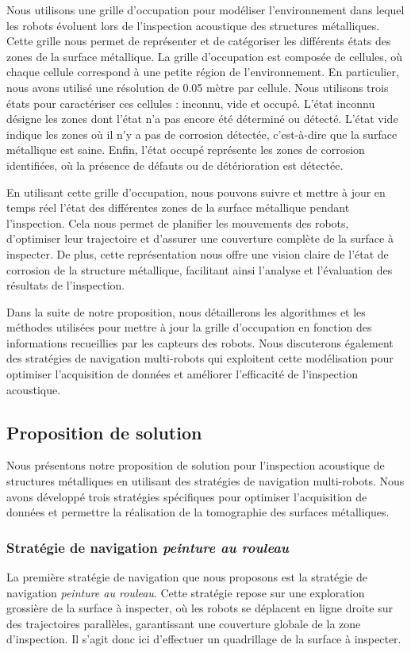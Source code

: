 \documentclass[francais,RandD]{rapportPFE}
\begin{document}
			Nous utilisons une grille d'occupation pour modéliser l'environnement dans lequel les robots évoluent lors de l'inspection acoustique des structures métalliques.
			Cette grille nous permet de représenter et de catégoriser les différents états des zones de la surface métallique.
			La grille d'occupation est composée de cellules, où chaque cellule correspond à une petite région de l'environnement.
			En particulier, nous avons utilisé une résolution de 0.05 mètre par cellule.
			Nous utilisons trois états pour caractériser ces cellules : inconnu, vide et occupé.
			L'état inconnu désigne les zones dont l'état n'a pas encore été déterminé ou détecté.
			L'état vide indique les zones où il n'y a pas de corrosion détectée, c'est-à-dire que la surface métallique est saine.
			Enfin, l'état occupé représente les zones de corrosion identifiées, où la présence de défauts ou de détérioration est détectée.

			En utilisant cette grille d'occupation, nous pouvons suivre et mettre à jour en temps réel l'état des différentes zones de la surface métallique pendant l'inspection.
			Cela nous permet de planifier les mouvements des robots, d'optimiser leur trajectoire et d'assurer une couverture complète de la surface à inspecter.
			De plus, cette représentation nous offre une vision claire de l'état de corrosion de la structure métallique, facilitant ainsi l'analyse et l'évaluation des résultats de l'inspection.

			Dans la suite de notre proposition, nous détaillerons les algorithmes et les méthodes utilisées pour mettre à jour la grille d'occupation en fonction des informations recueillies par les capteurs des robots.
			Nous discuterons également des stratégies de navigation multi-robots qui exploitent cette modélisation pour optimiser l'acquisition de données et améliorer l'efficacité de l'inspection acoustique.
		\subsection{Proposition de solution}
			Nous présentons notre proposition de solution pour l'inspection acoustique de structures métalliques en utilisant des stratégies de navigation multi-robots.
			Nous avons développé trois stratégies spécifiques pour optimiser l'acquisition de données et permettre la réalisation de la tomographie des surfaces métalliques.
			\subsubsection*{Stratégie de navigation \textit{peinture au rouleau}}
				La première stratégie de navigation que nous proposons est la stratégie de navigation \textit{peinture au rouleau}.
				Cette stratégie repose sur une exploration grossière de la surface à inspecter, où les robots se déplacent en ligne droite sur des trajectoires parallèles, garantissant une couverture globale de la zone d'inspection.
				Il s'agit donc ici d'effectuer un quadrillage de la surface à inspecter.
\end{document}
